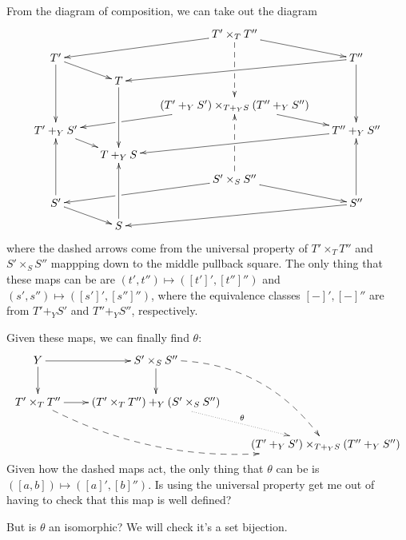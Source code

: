 \documentclass[12pt]{article}
\renewcommand{\(}{\left(}
\renewcommand{\)}{\right)}
\renewcommand{\{}{\left\lbrace}
\renewcommand{\}}{\right\rbrace}
\theoremstyle{remark}
\theoremstyle{definition}
\begin{document}
From the diagram of composition, we can take out the diagram
\begin{equation} \label{Diag:IL_Cubes}
	\xymatrix@R=.1in@C=.2in{
		{} &
		{} &
		{T' \times_T T''} 
			\ar[dll]
			\ar@{-->}[ddd]|\hole
			\ar[dr] &
		{} \\
		{T'} 
			\ar[ddd]
			\ar[dr] &
		{} &
		{} &
		{T''}
			\ar[dll]
			\ar[ddd] \\
			{} &
		{T} 
			\ar[ddd] &
		{} &
		{} \\
		{} &
		{} &
		{(T' +_Y S') \times_{T +_Y S} (T'' +_Y S'')} 
			\ar[dll]|(.65)\hole
			\ar[dr] &
		{} \\
		{T' +_Y S'} 
			\ar[dr] &
		{} &
		{} &
		{T'' +_Y S''} 
			\ar[dll] \\
		{} &
		{T +_Y S} &
		{} &
		{} \\
		{} &
		{} &
		{S' \times_{S} S''} 
			\ar[dll]|(.65)\hole 
			\ar@{-->}[uuu]|\hole 
			\ar[dr] &
		{} \\
		{S'} 
			\ar[uuu]
			\ar[dr] &
		{} &
		{} &
		{S''} 
			\ar[dll]
			\ar[uuu] \\
		{} &
		{S}
			\ar[uuu] &
		{} &
		{} \\
	}
\end{equation}
where the dashed arrows come from the universal property of $T' \times_T T''$ and $S' \times_S S''$ mappping down to the middle pullback square. The only thing that these maps can be are $(t',t'') \mapsto ([t']',[t'']'')$ and $(s',s'') \mapsto ([s']',[s'']'')$, where the equivalence classes $[-]',[-]''$ are from $T'+_YS'$ and $T''+_YS''$, respectively.

Given these maps, we can finally find $\theta$:
\begin{equation} \label{Diag:IL_UPForTheta}
	\xymatrix@C=.3in@R=.3in{
		{Y} 
			\ar[d]
			\ar[r] &
		{S' \times_S S''}
			\ar[d]
			\ar@{-->}@/^2pc/[ddr] &
		{} \\
		{T' \times_T T''}
			\ar[r] 
			\ar@{-->}@/_2pc/[drr] &
		{(T' \times_T T'') +_Y (S' \times_S S'')}
			\ar@{.>}[dr]^{\theta} &
		{} \\
		{} &
		{} &
		{(T' +_Y S') \times_{T +_Y S} (T'' +_Y S'')} 
	}
\end{equation}
Given how the dashed maps act, the only thing that $\theta$ can be is $([a,b]) \mapsto ([a]',[b]'')$. {\color{red} Is using the universal property get me out of having to check that this map is well defined?}

But is $\theta$ an isomorphic? We will check it's a set bijection.  
\end{document}
